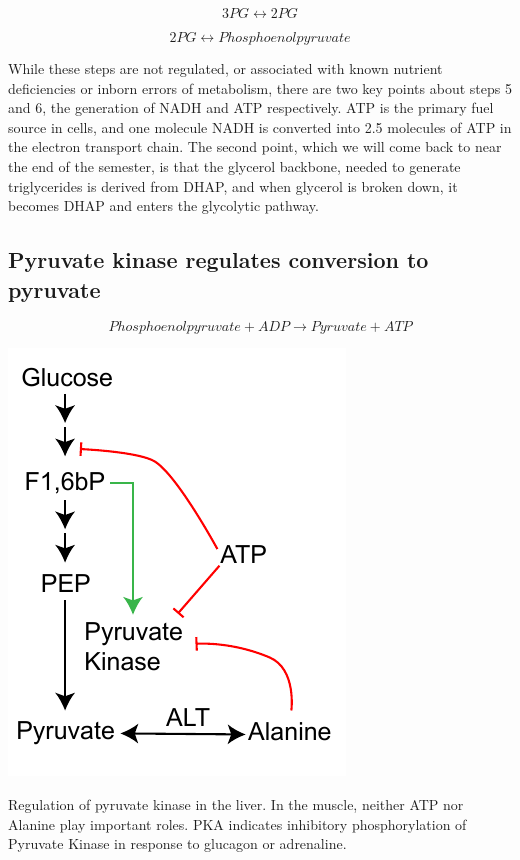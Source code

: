 \documentclass{tufte-handout}
\begin{document}
\begin{equation}
3PG \leftrightarrow 2PG
\end{equation}

\begin{equation}
2PG \leftrightarrow Phosphoenolpyruvate
\end{equation}

While these steps are not regulated, or associated with known nutrient deficiencies or inborn errors of metabolism, there are two key points about steps 5 and 6, the generation of NADH and ATP respectively.  ATP is the primary fuel source in cells, and one molecule NADH is converted into 2.5 molecules of ATP in the electron transport chain.  The second point, which we will come back to near the end of the semester, is that the glycerol backbone, needed to generate triglycerides is derived from DHAP, and when glycerol is broken down, it becomes DHAP and enters the glycolytic pathway.

\subsection{Pyruvate kinase regulates conversion to pyruvate}

\begin{equation}\label{eq:pk}
Phosphoenolpyruvate + ADP \rightarrow Pyruvate + ATP
\end{equation}

\begin{marginfigure}
\includegraphics{figures/pk-regulation.pdf}
\caption{Regulation of pyruvate kinase in the liver.  In the muscle, neither ATP nor Alanine play important roles.  PKA indicates inhibitory phosphorylation of Pyruvate Kinase in response to glucagon or adrenaline.}
\label{fig:pk-regulation}
\end{marginfigure}
\end{document}

